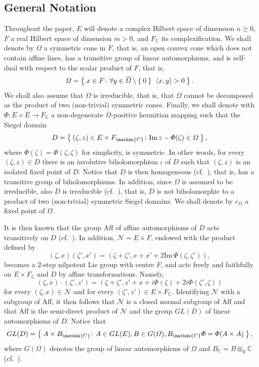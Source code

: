 \documentclass[10.5pt,reqno]{amsart}
\newcommand{\Aff}{\mathrm{Aff}}
\newcommand{\C}{\mathds{C}}
\newcommand{\R}{\mathds{R}}
\newcommand{\Nc}{\mathcal{N}}
\renewcommand{\Im}{\mathrm{Im}\,}
\newcommand{\Meg}{\geqslant}
\begin{document}
\subsection{General Notation}\label{sec:1:1}

Throughout the paper, $E$ will denote a complex Hilbert space of dimension $n\Meg 0$, $F$ a real Hilbert space of dimension $m>0$, and $F_\C$ its complexification. We shall denote by $\Omega$ a  symmetric cone in $F$, that is, an open convex cone which does not contain affine lines, has a transitive group of linear automorphisms, and is self-dual with respect to the scalar product of $F$, that is, 
\[
\Omega=\Set{x\in F\colon \forall y\in \overline{\Omega}\setminus \Set{0}\:\: \langle x,y\rangle>0}.
\] 
We shall also assume that $\Omega$ is irreducible, that is, that $\Omega$ cannot be decomposed as the product of two (non-trivial) symmetric cones. Finally, we shall denote with $\Phi\colon E\times E\to F_\C$ a non-degenerate $\overline{\Omega}$-positive  hermitian mapping such that the Siegel domain
\[
D=\Set{(\zeta,z)\in E\times F_\C\colon \Im z-\Phi(\zeta)\in \Omega},
\]
where $\Phi(\zeta)=\Phi(\zeta,\zeta)$ for simplicity, is symmetric. In other words, for every $(\zeta,z)\in D$ there is an involutive biholomorphism $\iota$ of $D$ such that $(\zeta,z)$ is an isolated fixed point of $D$. Notice that $D$ is then homogeneous (cf.~\cite[No.\ 17]{Cartan}), that is, has a transitive group of biholomorphisms. In addition, since $\Omega$ is assumed to be irreducible, also $D$ is irreducible (cf.~\cite[Corollary 4.8]{Nakajima}), that is, $D$ is not biholomorphic to a product of two (non-trivial) symmetric Siegel domains. We shall denote by $e_\Omega$ a fixed point of $\Omega$.

It is then known that the group $\Aff$ of affine automorphisms of $D$ acts transitively on $D$ (cf.~\cite[Theorem 7.3]{Murakami}). In addition, $\Nc=E\times F$, endowed with the product defined by
\[
(\zeta,x)(\zeta',x')=(\zeta+\zeta', x+x'+2\Im \Phi(\zeta,\zeta')),
\]
becomes a $2$-step nilpotent Lie group with centre $F$, and acts freely and faithfully on $E\times F_\C$ and $D$ by affine transformations. Namely,
\[
(\zeta,x)\cdot (\zeta',z')=(\zeta+\zeta', z'+x+i\Phi(\zeta)+2 i \Phi(\zeta',\zeta))
\]
for every $(\zeta,x)\in \Nc$ and for every $(\zeta',z')\in E\times F_\C$.
Identifying $\Nc$ with a subgroup of $\Aff$, it then follows that $\Nc$ is a closed normal subgroup of $\Aff$ and that $\Aff$ is the semi-direct product of $\Nc$ and the group $GL(D)$ of linear automorphisms of $D$. Notice that
\[
GL(D)=\Set{A\times B_\C\colon A\in GL(E),  B\in G(\Omega), B_\C \Phi=\Phi(A\times A)},
\]
where $G(\Omega)$ denotes the group of linear automorphisms of $\Omega$ and $B_\C=B\otimes_\R \C$ (cf.~\cite[Propositions 2.1 and 2.2]{Murakami}). 
\end{document}
